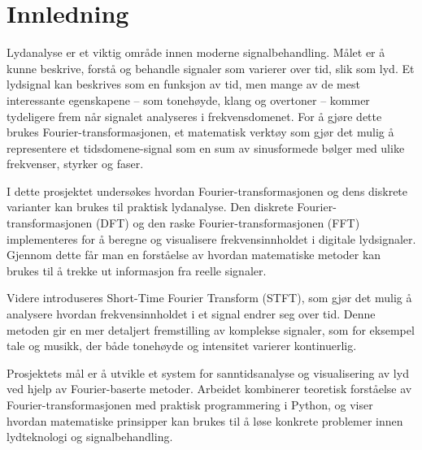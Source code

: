 \section{Innledning}
Lydanalyse er et viktig område innen moderne signalbehandling. Målet er å kunne beskrive, forstå og behandle signaler som varierer over tid, slik som lyd. Et lydsignal kan beskrives som en funksjon av tid, men mange av de mest interessante egenskapene – som tonehøyde, klang og overtoner – kommer tydeligere frem når signalet analyseres i frekvensdomenet. For å gjøre dette brukes Fourier-transformasjonen, et matematisk verktøy som gjør det mulig å representere et tidsdomene-signal som en sum av sinusformede bølger med ulike frekvenser, styrker og faser.

I dette prosjektet undersøkes hvordan Fourier-transformasjonen og dens diskrete varianter kan brukes til praktisk lydanalyse. Den diskrete Fourier-transformasjonen (DFT) og den raske Fourier-transformasjonen (FFT) implementeres for å beregne og visualisere frekvensinnholdet i digitale lydsignaler. Gjennom dette får man en forståelse av hvordan matematiske metoder kan brukes til å trekke ut informasjon fra reelle signaler.

Videre introduseres Short-Time Fourier Transform (STFT), som gjør det mulig å analysere hvordan frekvensinnholdet i et signal endrer seg over tid. Denne metoden gir en mer detaljert fremstilling av komplekse signaler, som for eksempel tale og musikk, der både tonehøyde og intensitet varierer kontinuerlig.

Prosjektets mål er å utvikle et system for sanntidsanalyse og visualisering av lyd ved hjelp av Fourier-baserte metoder. Arbeidet kombinerer teoretisk forståelse av Fourier-transformasjonen med praktisk programmering i Python, og viser hvordan matematiske prinsipper kan brukes til å løse konkrete problemer innen lydteknologi og signalbehandling.